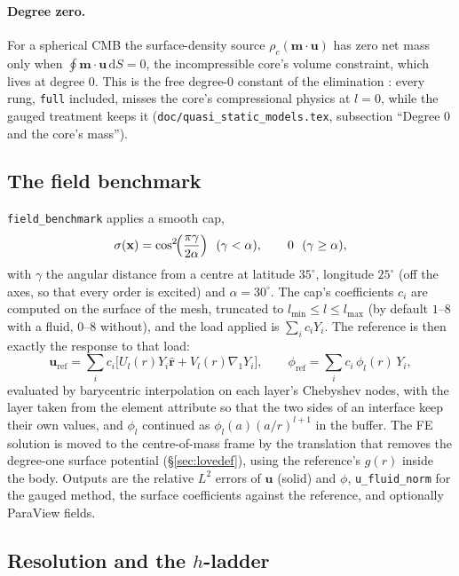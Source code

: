\documentclass[11pt]{article}
\numberwithin{equation}{section}
\newcommand{\dS}{\,\mathrm{d}S}
\newcommand{\vu}{\mathbf{u}}
\newcommand{\vx}{\mathbf{x}}
\newcommand{\vm}{\mathbf{m}}
\newcommand{\rhat}{\hat{\mathbf{r}}}
\newcommand{\code}[1]{\texttt{#1}}
\newcommand{\gradone}{\nabla_{1}}
\begin{document}
\paragraph{Degree zero.}
For a spherical CMB the surface-density source $\rho_c(\vm\cdot\vu)$ has
zero net mass only when $\oint\vm\cdot\vu\dS=0$, the incompressible core's
volume constraint, which lives at degree 0. This is the free degree-0
constant of the elimination \cite{AW10}: every rung, \code{full} included,
misses the core's compressional physics at $l=0$, while the gauged
treatment keeps it (\code{doc/quasi\_static\_models.tex}, subsection
``Degree 0 and the core's mass'').

\subsection{The field benchmark}

\code{field\_benchmark} applies a smooth cap,
\begin{equation}
  \sigma(\vx) = \cos^2\!\Bigl(\frac{\pi\gamma}{2\alpha}\Bigr)\ \ (\gamma<\alpha),
  \qquad 0\ \ (\gamma\ge\alpha),
  \label{eq:cap}
\end{equation}
with $\gamma$ the angular distance from a centre at latitude $35^\circ$,
longitude $25^\circ$ (off the axes, so that every order is excited) and
$\alpha=30^\circ$. The cap's coefficients $c_i$ are computed on the
surface of the mesh, truncated to $l_{\min}\le l\le l_{\max}$ (by default
$1$--$8$ with a fluid, $0$--$8$ without), and the load applied is
$\sum_i c_iY_i$. The reference is then exactly the response to that load:
\begin{equation}
  \vu_{\text{ref}} = \sum_i c_i\bigl[U_{l}(r)Y_i\rhat + V_l(r)\gradone Y_i\bigr],
  \qquad
  \phi_{\text{ref}} = \sum_i c_i\,\phi_l(r)\,Y_i,
  \label{eq:fieldref}
\end{equation}
evaluated by barycentric interpolation on each layer's Chebyshev nodes,
with the layer taken from the element attribute so that the two sides of
an interface keep their own values, and $\phi_l$ continued as
$\phi_l(a)(a/r)^{l+1}$ in the buffer. The FE solution is moved to the
centre-of-mass frame by the translation that removes the degree-one
surface potential (\S\ref{sec:lovedef}), using the reference's $g(r)$
inside the body. Outputs are the relative $L^2$ errors of $\vu$ (solid)
and $\phi$, \code{u\_fluid\_norm} for the gauged method, the surface
coefficients against the reference, and optionally ParaView fields.

\subsection{\texorpdfstring{Resolution and the $h$-ladder}{Resolution and the h-ladder}}
\label{sec:ladder}
\end{document}
